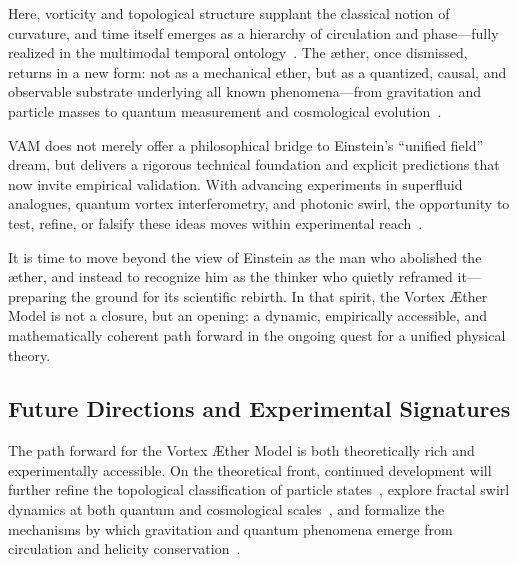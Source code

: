 Here, vorticity and topological structure supplant the classical notion of curvature, and time itself emerges as a hierarchy of circulation and phase—fully realized in the multimodal temporal ontology~\cite{VAM-13, VAM-15}. The æther, once dismissed, returns in a new form: not as a mechanical ether, but as a quantized, causal, and observable substrate underlying all known phenomena—from gravitation and particle masses to quantum measurement and cosmological evolution~\cite{VAM-8, VAM-11, VAM-15}.

VAM does not merely offer a philosophical bridge to Einstein’s “unified field” dream, but delivers a rigorous technical foundation and explicit predictions that now invite empirical validation. With advancing experiments in superfluid analogues, quantum vortex interferometry, and photonic swirl, the opportunity to test, refine, or falsify these ideas moves within experimental reach~\cite{VAM-2, VAM-13, VAM-15}.

It is time to move beyond the view of Einstein as the man who abolished the æther, and instead to recognize him as the thinker who quietly reframed it—preparing the ground for its scientific rebirth. In that spirit, the Vortex Æther Model is not a closure, but an opening: a dynamic, empirically accessible, and mathematically coherent path forward in the ongoing quest for a unified physical theory.

\subsection*{Future Directions and Experimental Signatures}

The path forward for the Vortex Æther Model is both theoretically rich and experimentally accessible. On the theoretical front, continued development will further refine the topological classification of particle states~\cite{VAM-11, VAM-14}, explore fractal swirl dynamics at both quantum and cosmological scales~\cite{VAM-12, VAM-9}, and formalize the mechanisms by which gravitation and quantum phenomena emerge from circulation and helicity conservation~\cite{VAM-13, VAM-15}.

